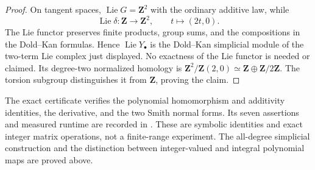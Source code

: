 \begin{proof}
On tangent spaces, \(\operatorname{Lie}G=\mathbf Z^2\) with the
ordinary additive law, while
\[
 \operatorname{Lie}\delta:\mathbf Z\longrightarrow\mathbf Z^2,
 \qquad t\longmapsto(2t,0).
\]
The Lie functor preserves finite products, group sums, and the
compositions in the Dold--Kan formulas.  Hence
\(\operatorname{Lie}Y_\bullet\) is the Dold--Kan simplicial module of
the two-term Lie complex just displayed.  No exactness of the Lie
functor is needed or claimed.  Its degree-two normalized homology is
\(\mathbf Z^2/\mathbf Z(2,0)\simeq\mathbf Z\oplus\mathbf Z/2\mathbf Z\).
The torsion subgroup distinguishes it from \(\mathbf Z\), proving the
claim.
\end{proof}

The exact certificate 
verifies the polynomial homomorphism and additivity identities, the
derivative, and the two Smith normal forms.  Its seven assertions and
measured runtime are recorded in
.  These are symbolic
identities and exact integer matrix operations, not a finite-range
experiment.  The all-degree simplicial construction and the distinction
between integer-valued and integral polynomial maps are proved above.


